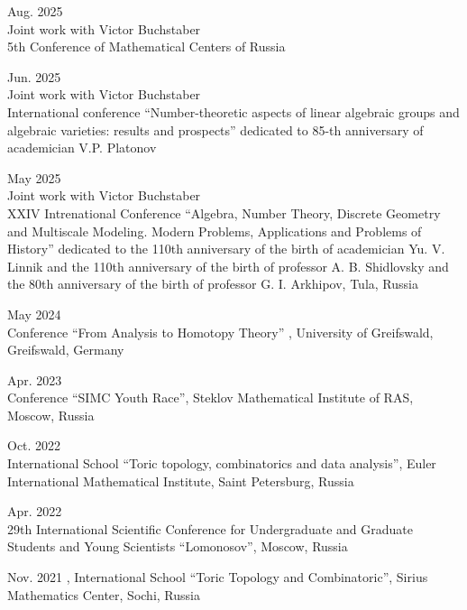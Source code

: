 \documentclass[11pt,letterpaper]{report}
\begin{document}
    \begin{tablist}
    
       \item{Aug. 2025} \\ Joint work with Victor Buchstaber\\ 5th Conference of Mathematical Centers of Russia
       
       \item{Jun. 2025} \\ Joint work with Victor Buchstaber \\International conference ``Number-theoretic aspects of linear algebraic groups and algebraic varieties: results and prospects'' dedicated to 85-th anniversary of academician V.P. Platonov
    
       \item{May 2025} \\ Joint work with Victor Buchstaber\\ XXIV Intrenational Conference ``Algebra, Number Theory, Discrete Geometry and Multiscale Modeling. Modern Problems, Applications and Problems of History'' dedicated to the 110th anniversary of the birth of academician Yu. V. Linnik and the 110th anniversary of the birth of professor A. B. Shidlovsky and the 80th anniversary of the birth of professor G. I. Arkhipov, Tula, Russia
       
         
       \item{May 2024} \\ Conference ``From Analysis to Homotopy Theory'' , University of Greifswald, Greifswald, Germany 
    
       \item{Apr. 2023} \\ Conference 	``SIMC Youth Race'', Steklov Mathematical Institute of RAS, Moscow, Russia
       
        \item{Oct. 2022} \\ International School ``Toric topology, combinatorics and data analysis'', Euler International Mathematical Institute, Saint Petersburg, Russia
       
       \item{Apr. 2022} \\ 29th International Scientific Conference for Undergraduate and Graduate Students and Young Scientists ``Lomonosov'', Moscow, Russia
       
         \item{Nov. 2021} , International School
``Toric Topology and Combinatoric'', Sirius Mathematics Center, Sochi, Russia
          
    \end{tablist}
    
\end{document}
